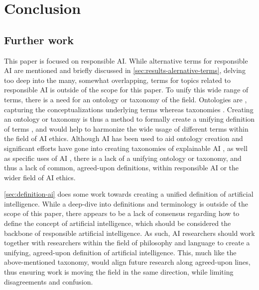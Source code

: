 \section{Conclusion}
\label{sec:Conclusion}


\subsection{Further work}
This paper is focused on responsible AI. While alternative terms for responsible AI are mentioned and briefly discussed in \autoref{sec:results-alernative-terms}, delving too deep into the many, somewhat overlapping, terms for topics related to responsible AI is outside of the scope for this paper. To unify this wide range of terms, there is a need for an ontology or 
taxonomy of the field. Ontologies are , capturing the conceptualizations underlying terms \parencite{Chandrasekaran_1999} whereas taxonomies  \parencite{Kundisch_2022}. Creating an ontology or taxonomy is thus a method to formally create a unifying definition of terms \parencite{Uschold_1996}, and would help to harmonize the wide usage of different terms within the field of AI ethics. Although AI has been used to aid ontology creation \parencite{Stumme_2001} and significant efforts have gone into creating taxonomies of explainable AI \parencite{BarredoArrieta_2020,Clinciu_2019,Graziani_2022,Bellucci_2021,Brennen_2020}, as well as specific uses of AI \parencite{Gunn_2009,Ören_1994,Fong_2003}, there is a lack of a unifying ontology or taxonomy, and thus a lack of common, agreed-upon definitions, within responsible AI or the wider field of AI ethics. %

\autoref{sec:definition-ai} does some work towards creating a unified definition of artificial intelligence. While a deep-dive into definitions and terminology is outside of the scope of this paper, there appears to be a lack of consensus regarding how to define the concept of artificial intelligence, which should be considered the backbone of responsible artificial intelligence. As such, AI researchers should work together with researchers within the field of philosophy and language to create a unifying, agreed-upon definition of artificial intelligence. This, much like the above-mentioned taxonomy, would align future research along agreed-upon lines, thus ensuring work is moving the field in the same direction, while limiting disagreements and confusion.


